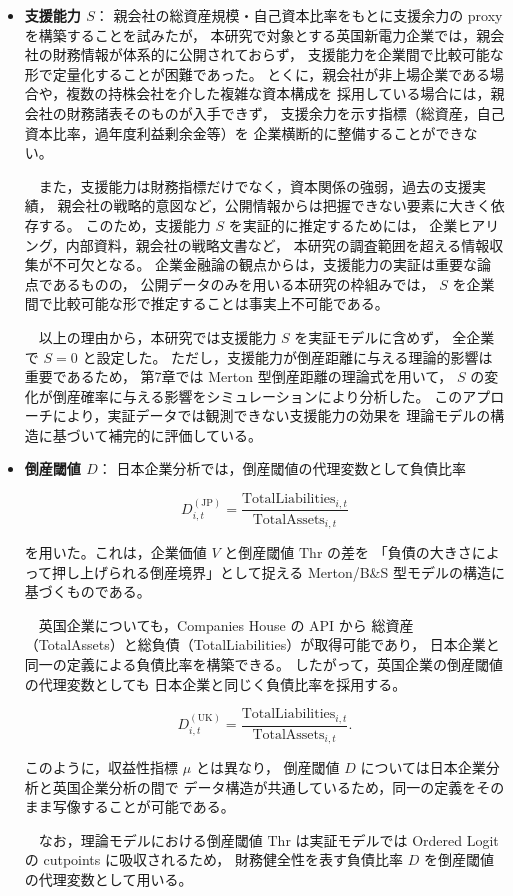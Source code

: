 \begin{itemize}
\item \textbf{支援能力 $S$}：  
親会社の総資産規模・自己資本比率をもとに支援余力の proxy を構築することを試みたが，
本研究で対象とする英国新電力企業では，親会社の財務情報が体系的に公開されておらず，
支援能力を企業間で比較可能な形で定量化することが困難であった。
とくに，親会社が非上場企業である場合や，複数の持株会社を介した複雑な資本構成を
採用している場合には，親会社の財務諸表そのものが入手できず，
支援余力を示す指標（総資産，自己資本比率，過年度利益剰余金等）を
企業横断的に整備することができない。

　また，支援能力は財務指標だけでなく，資本関係の強弱，過去の支援実績，
親会社の戦略的意図など，公開情報からは把握できない要素に大きく依存する。
このため，支援能力 $S$ を実証的に推定するためには，
企業ヒアリング，内部資料，親会社の戦略文書など，
本研究の調査範囲を超える情報収集が不可欠となる。
企業金融論の観点からは，支援能力の実証は重要な論点であるものの，
公開データのみを用いる本研究の枠組みでは，
$S$ を企業間で比較可能な形で推定することは事実上不可能である。

　以上の理由から，本研究では支援能力 $S$ を実証モデルに含めず，
全企業で $S=0$ と設定した。
ただし，支援能力が倒産距離に与える理論的影響は重要であるため，
第7章では Merton 型倒産距離の理論式を用いて，
$S$ の変化が倒産確率に与える影響をシミュレーションにより分析した。
このアプローチにより，実証データでは観測できない支援能力の効果を
理論モデルの構造に基づいて補完的に評価している。
\end{itemize}


\begin{itemize}
\item \textbf{倒産閾値 $D$}：  
日本企業分析では，倒産閾値の代理変数として負債比率



\[
D_{i,t}^{(\text{JP})}
= \frac{\text{TotalLiabilities}_{i,t}}{\text{TotalAssets}_{i,t}}
\]



を用いた。これは，企業価値 $V$ と倒産閾値 $\mathrm{Thr}$ の差を
「負債の大きさによって押し上げられる倒産境界」として捉える
Merton/B\&S 型モデルの構造に基づくものである。

　英国企業についても，Companies House の API から
総資産（TotalAssets）と総負債（TotalLiabilities）が取得可能であり，
日本企業と同一の定義による負債比率を構築できる。
したがって，英国企業の倒産閾値の代理変数としても
日本企業と同じく負債比率を採用する。



\[
D_{i,t}^{(\text{UK})}
= \frac{\text{TotalLiabilities}_{i,t}}{\text{TotalAssets}_{i,t}}.
\]



このように，収益性指標 $\mu$ とは異なり，
倒産閾値 $D$ については日本企業分析と英国企業分析の間で
データ構造が共通しているため，同一の定義をそのまま写像することが可能である。

　なお，理論モデルにおける倒産閾値 $\mathrm{Thr}$ は実証モデルでは
Ordered Logit の cutpoints に吸収されるため，
財務健全性を表す負債比率 $D$ を倒産閾値の代理変数として用いる。
\end{itemize}

